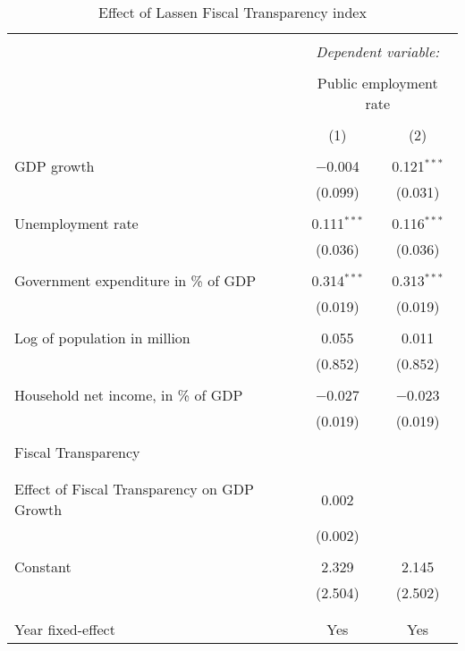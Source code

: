 
\begin{table}[!htbp] \centering 
  \caption{Effect of Lassen Fiscal Transparency index} 
  \label{} 
\begin{tabular}{@{\extracolsep{5pt}}lcc} 
\\[-1.8ex]\hline 
\hline \\[-1.8ex] 
 & \multicolumn{2}{c}{\textit{Dependent variable:}} \\ 
\cline{2-3} 
\\[-1.8ex] & \multicolumn{2}{c}{Public employment rate} \\ 
\\[-1.8ex] & (1) & (2)\\ 
\hline \\[-1.8ex] 
 GDP growth & $-$0.004 & 0.121$^{***}$ \\ 
  & (0.099) & (0.031) \\ 
  & & \\ 
 Unemployment rate & 0.111$^{***}$ & 0.116$^{***}$ \\ 
  & (0.036) & (0.036) \\ 
  & & \\ 
 Government expenditure in \% of GDP & 0.314$^{***}$ & 0.313$^{***}$ \\ 
  & (0.019) & (0.019) \\ 
  & & \\ 
 Log of population in million & 0.055 & 0.011 \\ 
  & (0.852) & (0.852) \\ 
  & & \\ 
 Household net income, in \% of GDP & $-$0.027 & $-$0.023 \\ 
  & (0.019) & (0.019) \\ 
  & & \\ 
 Fiscal Transparency &  &  \\ 
  &  &  \\ 
  & & \\ 
 Effect of Fiscal Transparency on GDP Growth & 0.002 &  \\ 
  & (0.002) &  \\ 
  & & \\ 
 Constant & 2.329 & 2.145 \\ 
  & (2.504) & (2.502) \\ 
  & & \\ 
\hline \\[-1.8ex] 
Year fixed-effect & Yes & Yes \\ 

\end{tabular}
\end{table}
